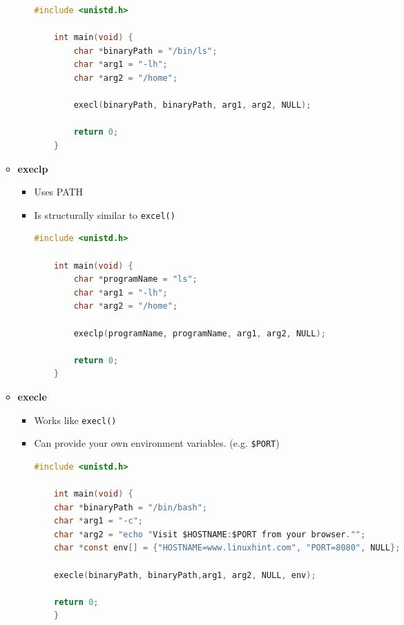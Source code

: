 \documentclass[12pt]{article}
\begin{document}
\begin{enumerate}[1.]
\begin{itemize}
\begin{itemize}
\begin{lstlisting}[language=c]
    #include <unistd.h>

    int main(void) {
        char *binaryPath = "/bin/ls";
        char *arg1 = "-lh";
        char *arg2 = "/home";

        execl(binaryPath, binaryPath, arg1, arg2, NULL);

        return 0;
    }
\end{lstlisting}

        \end{itemize}

        \item \textbf{execlp}

        \begin{itemize}
            \item Uses PATH
            \item Is structurally similar to \texttt{excel()}

\begin{lstlisting}[language=c]
    #include <unistd.h>

    int main(void) {
        char *programName = "ls";
        char *arg1 = "-lh";
        char *arg2 = "/home";

        execlp(programName, programName, arg1, arg2, NULL);

        return 0;
    }
\end{lstlisting}
        \end{itemize}

        \item \textbf{execle}
        \begin{itemize}
            \item Works like \texttt{execl()}
            \item Can provide your own environment variables. (e.g. \texttt{\$PORT})

\begin{lstlisting}[language=c]
    #include <unistd.h>

    int main(void) {
    char *binaryPath = "/bin/bash";
    char *arg1 = "-c";
    char *arg2 = "echo "Visit $HOSTNAME:$PORT from your browser."";
    char *const env[] = {"HOSTNAME=www.linuxhint.com", "PORT=8080", NULL};

    execle(binaryPath, binaryPath,arg1, arg2, NULL, env);

    return 0;
    }
\end{lstlisting}
        \end{itemize}


\end{itemize}
\end{enumerate}
\end{document}
